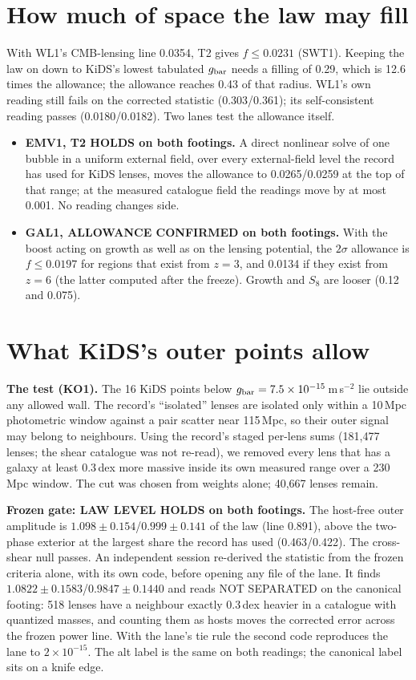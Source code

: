 \documentclass[10pt]{article}
\begin{document}
\section{How much of space the law may fill}
With WL1's CMB-lensing line 0.0354, T2 gives $f\le0.0231$ (SWT1). Keeping the law on down to KiDS's lowest tabulated $g_{\rm bar}$ needs a filling of 0.29, which is 12.6 times the allowance; the allowance reaches 0.43 of that radius. WL1's own reading still fails on the corrected statistic (0.303/0.361); its self-consistent reading passes (0.0180/0.0182).
Two lanes test the allowance itself.
\begin{itemize}
\item \textbf{EMV1, T2 HOLDS on both footings.} A direct nonlinear solve of one bubble in a uniform external field, over every external-field level the record has used for KiDS lenses, moves the allowance to 0.0265/0.0259 at the top of that range; at the measured catalogue field the readings move by at most 0.001. No reading changes side.
\item \textbf{GAL1, ALLOWANCE CONFIRMED on both footings.} With the boost acting on growth as well as on the lensing potential, the $2\sigma$ allowance is $f\le0.0197$ for regions that exist from $z=3$, and 0.0134 if they exist from $z=6$ (the latter computed after the freeze). Growth and $S_8$ are looser (0.12 and 0.075).
\end{itemize}

\section{What KiDS's outer points allow}
\textbf{The test (KO1).} The 16 KiDS points below $g_{\rm bar}=7.5\times10^{-15}$\,m\,s$^{-2}$ lie outside any allowed wall. The record's ``isolated'' lenses are isolated only within a 10\,Mpc photometric window against a pair scatter near 115\,Mpc, so their outer signal may belong to neighbours. Using the record's staged per-lens sums (181,477 lenses; the shear catalogue was not re-read), we removed every lens that has a galaxy at least 0.3\,dex more massive inside its own measured range over a 230\,Mpc window. The cut was chosen from weights alone; 40,667 lenses remain.

\textbf{Frozen gate: LAW LEVEL HOLDS on both footings.} The host-free outer amplitude is $1.098\pm0.154$/$0.999\pm0.141$ of the law (line 0.891), above the two-phase exterior at the largest share the record has used (0.463/0.422). The cross-shear null passes. An independent session re-derived the statistic from the frozen criteria alone, with its own code, before opening any file of the lane. It finds $1.0822\pm0.1583$/$0.9847\pm0.1440$ and reads NOT SEPARATED on the canonical footing: 518 lenses have a neighbour exactly 0.3\,dex heavier in a catalogue with quantized masses, and counting them as hosts moves the corrected error across the frozen power line. With the lane's tie rule the second code reproduces the lane to $2\times10^{-15}$. The alt label is the same on both readings; the canonical label sits on a knife edge.
\end{document}
